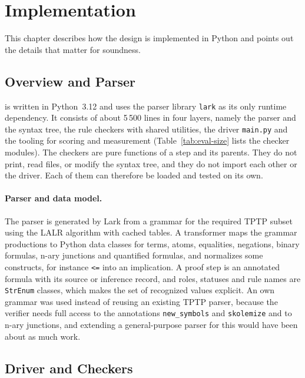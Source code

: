 \section{Implementation}
\label{sec:implementation}

This chapter describes how the design is implemented in Python and points out the details that matter for soundness.

\subsection{Overview and Parser}
\label{subsec:impl-overview}

\TSTPy{} is written in Python~3.12 and uses the parser library \texttt{lark} as its only runtime dependency.
It consists of about 5\,500 lines in four layers, namely the parser and the syntax tree, the rule checkers with shared utilities, the driver \texttt{main.py} and the tooling for scoring and measurement (Table~\ref{tab:eval-size} lists the checker modules).
The checkers are pure functions of a step and its parents. They do not print, read files, or modify the syntax tree, and they do not import each other or the driver. Each of them can therefore be loaded and tested on its own.

\paragraph{Parser and data model.}
\label{subsec:impl-parser}
\label{subsec:impl-model}

The parser is generated by Lark from a grammar for the required TPTP subset using the LALR algorithm with cached tables.
A transformer maps the grammar productions to Python data classes for terms, atoms, equalities, negations, binary formulas, n-ary junctions and quantified formulas, and normalizes some constructs, for instance \verb|<=| into an implication.
A proof step is an annotated formula with its source or inference record, and roles, statuses and rule names are \texttt{StrEnum} classes, which makes the set of recognized values explicit.
An own grammar was used instead of reusing an existing TPTP parser, because the verifier needs full access to the annotations \texttt{new\_symbols} and \texttt{skolemize} and to n-ary junctions, and extending a general-purpose parser for this would have been about as much work.

\subsection{Driver and Checkers}
\label{subsec:impl-driver}
\label{subsec:impl-global}

